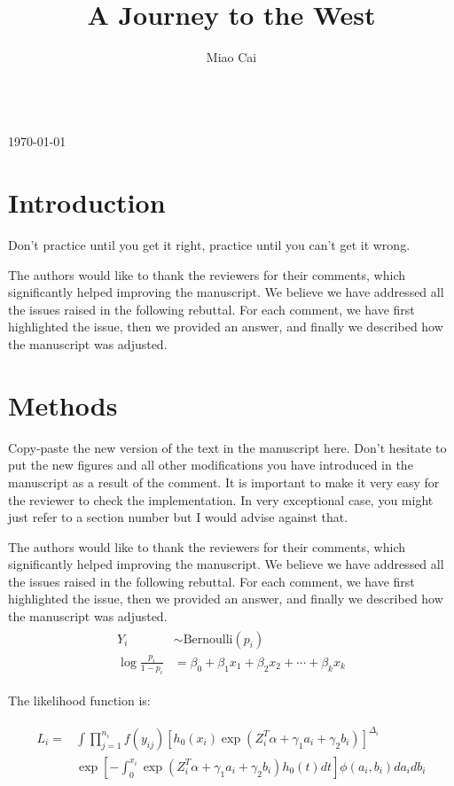 \documentclass[12pt,a4paper]{article}
\title{A Journey to the West}
\author{Miao Cai}
\makeatletter
\renewcommand{\maketitle}{\bgroup
  \flushleft{\huge{\textbf{\@title}}}  \vspace{5mm}
    \setlength{\parindent}{22pt}
  
  \large{\@author} 	\\\vspace{1.5mm}
  \large{\today}
\egroup
}
\makeatother
\begin{document}
\maketitle

\section{Introduction}
\begin{mdframed}[style=greybox] 
Don't practice until you get it right, practice until you can't get it wrong.
\end{mdframed}

The authors would like to thank the reviewers for their comments, which significantly helped improving the manuscript. We believe we have addressed all the issues raised in the following rebuttal. For each comment, we have first highlighted the issue, then we provided an answer, and finally we described how the manuscript was adjusted.



\section{Methods}
Copy-paste the new version of the text in the manuscript here. Don't hesitate to put the new figures and all other modifications you have introduced in the manuscript as a result of the comment. It is important to make it very easy for the reviewer to check the implementation. In very exceptional case, you might just refer to a section number but I would advise against that.

The authors would like to thank the reviewers for their comments, which significantly helped improving the manuscript. We believe we have addressed all the issues raised in the following rebuttal. For each comment, we have first highlighted the issue, then we provided an answer, and finally we described how the manuscript was adjusted.
\begin{align}
\begin{split}
Y_i &\sim \text{Bernoulli}(p_i)\\	
\log \frac{p_i}{1 - p_i} & = \beta_0 + \beta_1x_1 + \beta_2x_2 + \cdots + \beta_kx_k	
\end{split}
\end{align}

The likelihood function is:

\begin{align}
\begin{split}
L_{i}=& \int \prod_{j=1}^{n_{i}} f\left(y_{i j}\right)\left[h_{0}\left(x_{i}\right) \exp \left(Z_{i}^{T} \alpha+\gamma_{1} a_{i}+\gamma_{2} b_{i}\right)\right]^{\Delta_{i}} \\ 
& \exp \left[-\int_{0}^{x_{i}} \exp \left(Z_{i}^{T} \alpha+\gamma_{1} a_{i}+\gamma_{2} b_{i}\right) h_{0}(t) d t\right] \phi\left(a_{i}, b_{i}\right) d a_{i} d b_{i} 
\end{split}
\end{align}
\end{document}
